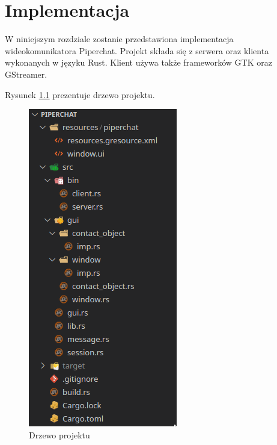 \chapter{Implementacja}

W niniejszym rozdziale zostanie przedstawiona implementacja wideokomunikatora Piperchat. Projekt
składa się z serwera oraz klienta wykonanych w języku Rust. Klient używa także frameworków GTK oraz
GStreamer.

Rysunek \ref{fig:project_tree} prezentuje drzewo projektu.

\begin{figure}[H]
    \centering
    \includegraphics[height=.4\textheight]{img/implementacja/project_tree}
    \caption{Drzewo projektu}
    \label{fig:project_tree}
\end{figure}

